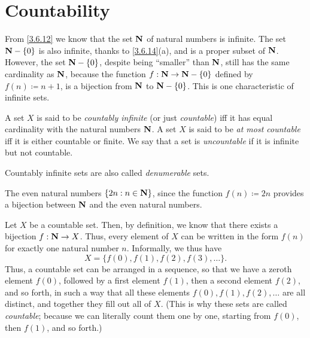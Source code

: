 \section{Countability}\label{sec 8.1}

\begin{note}
  From \cref{3.6.12} we know that the set \(\mathbf{N}\) of natural numbers is infinite.
  The set \(\mathbf{N} - \{0\}\) is also infinite, thanks to \cref{3.6.14}(a), and is a proper subset of \(\mathbf{N}\).
  However, the set \(\mathbf{N} - \{0\}\), despite being ``smaller'' than \(\mathbf{N}\), still has the same cardinality as \(\mathbf{N}\), because the function \(f : \mathbf{N} \to \mathbf{N} - \{0\}\) defined by \(f(n) \coloneqq n + 1\), is a bijection from \(\mathbf{N}\) to \(\mathbf{N} - \{0\}\).
  This is one characteristic of infinite sets.
\end{note}

\begin{definition}\label{8.1.1}
  A set \(X\) is said to be \emph{countably infinite} (or just \emph{countable}) iff it has equal cardinality with the natural numbers \(\mathbf{N}\).
  A set \(X\) is said to be \emph{at most countable} iff it is either countable or finite.
  We say that a set is \emph{uncountable} if it is infinite but not countable.
\end{definition}

\begin{remark}\label{8.1.2}
  Countably infinite sets are also called \emph{denumerable} sets.
\end{remark}

\begin{example}\label{8.1.3}
  The even natural numbers \(\{2n : n \in \mathbf{N}\}\), since the function \(f(n) \coloneqq 2n\) provides a bijection between \(\mathbf{N}\) and the even natural numbers.
\end{example}

\begin{note}
  Let \(X\) be a countable set.
  Then, by definition, we know that there exists a bijection \(f : \mathbf{N} \to X\).
  Thus, every element of \(X\) can be written in the form \(f(n)\) for exactly one natural number \(n\).
  Informally, we thus have
  \[
    X = \{f(0), f(1), f(2), f(3), \dots\}.
  \]
  Thus, a countable set can be arranged in a sequence, so that we have a zeroth element \(f(0)\), followed by a first element \(f(1)\), then a second element \(f(2)\), and so forth, in such a way that all these elements \(f(0), f(1), f(2), \dots\) are all distinct, and together they fill out all of \(X\).
  (This is why these sets are called \emph{countable};
  because we can literally count them one by one, starting from \(f(0)\), then \(f(1)\), and so forth.)
\end{note}

